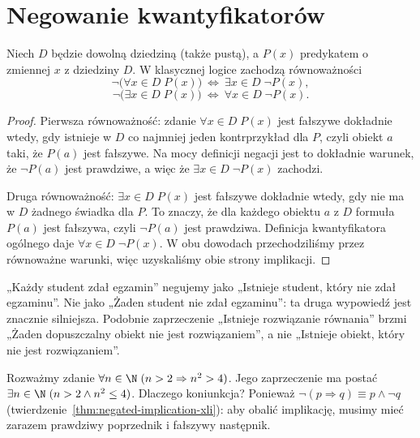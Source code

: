 \section{Negowanie kwantyfikatorów}\label{sec:quantifier-negation}
\begin{twierdzenie}
\label{thm:negation-quantifiers}
Niech $D$ będzie dowolną dziedziną (także pustą), a
$P(x)$ predykatem o zmiennej $x$ z dziedziny $D$.
W klasycznej logice zachodzą równoważności
\[
\neg\bigl(\forall x\in D\;P(x)\bigr)
\ \Leftrightarrow\ \exists x\in D\;\neg P(x),
\]
\[
\neg\bigl(\exists x\in D\;P(x)\bigr)
\ \Leftrightarrow\ \forall x\in D\;\neg P(x).
\]
\end{twierdzenie}
\begin{proof}
Pierwsza równoważność: zdanie $\forall x\in D\;P(x)$
jest fałszywe dokładnie wtedy, gdy istnieje w $D$
co najmniej jeden kontrprzykład dla $P$, czyli
obiekt $a$ taki, że $P(a)$ jest fałszywe.
Na mocy definicji negacji jest to dokładnie warunek,
że $\neg P(a)$ jest prawdziwe, a więc że
$\exists x\in D\;\neg P(x)$ zachodzi.

Druga równoważność: $\exists x\in D\;P(x)$
jest fałszywe dokładnie wtedy, gdy nie ma w $D$
żadnego świadka dla $P$. To znaczy, że dla
każdego obiektu $a$ z $D$ formuła $P(a)$
jest fałszywa, czyli $\neg P(a)$ jest prawdziwa.
Definicja kwantyfikatora ogólnego daje
$\forall x\in D\;\neg P(x)$.
W obu dowodach przechodziliśmy przez równoważne
warunki, więc uzyskaliśmy obie strony implikacji.
\end{proof}

\begin{przyklad}
„Każdy student zdał egzamin” negujemy jako
„Istnieje student, który nie zdał egzaminu”.
Nie jako „Żaden student nie zdał egzaminu”:
ta druga wypowiedź jest znacznie silniejsza.
Podobnie zaprzeczenie „Istnieje rozwiązanie równania”
brzmi „Żaden dopuszczalny obiekt nie jest rozwiązaniem”,
a nie „Istnieje obiekt, który nie jest rozwiązaniem”.
\end{przyklad}

\begin{przyklad}
Rozważmy zdanie
$\forall n\in\N\;(n>2\Rightarrow n^2>4)$.
Jego zaprzeczenie ma postać
$\exists n\in\N\;(n>2\land n^2\le4)$.
Dlaczego koniunkcja? Ponieważ
$\neg(p\Rightarrow q)\equiv p\land\neg q$
(twierdzenie~\ref{thm:negated-implication-xli}):
aby obalić implikację, musimy mieć zarazem
prawdziwy poprzednik i fałszywy następnik.
\end{przyklad}

